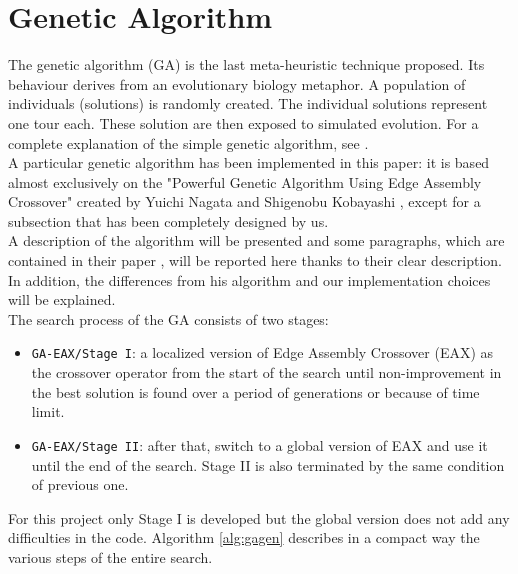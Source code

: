 \section{Genetic Algorithm}
The genetic algorithm (GA) is the last meta-heuristic technique proposed. Its behaviour derives from an evolutionary biology metaphor. A population of individuals (solutions) is randomly created. The individual solutions represent one tour each. These solution are then exposed to simulated evolution.
For a complete explanation of the simple genetic algorithm, see \cite{phdthesis}.\\
A particular genetic algorithm has been implemented in this paper: it is based almost exclusively on the "Powerful Genetic Algorithm Using Edge Assembly Crossover" created by Yuichi Nagata and Shigenobu Kobayashi \cite{Nagata2013, Honda2013}, except for a subsection that has been completely designed by us.\\ A description of the algorithm will be presented and some paragraphs, which are contained in their paper \cite{Nagata2013}, will be reported here thanks to their clear description. In addition, the differences from his algorithm and our implementation choices will be explained.\\
The search process of the GA consists of two stages: \\
\begin{itemize}
\item \texttt{GA-EAX/Stage I}: a localized version of Edge Assembly Crossover (EAX) as the crossover operator from the start of the search until non-improvement in the best solution is found over a period of generations or because of time limit.
\item  \texttt{GA-EAX/Stage II}: after that, switch to a global version of EAX and use it until the end of the search. Stage II is also terminated by the same condition of previous one.
\end{itemize}
For this project only Stage I is developed but the global version does not add any difficulties in the code. Algorithm \ref{alg:gagen} describes in a compact way the various steps of the entire search.\\

